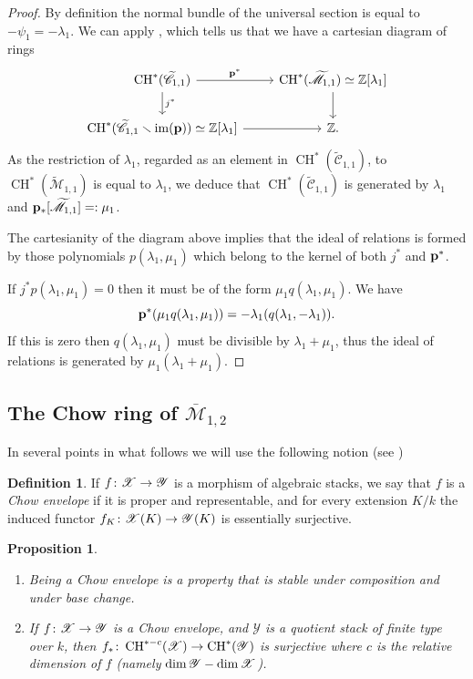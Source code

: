 \documentclass[a4paper, 10pt]{amsart}
\numberwithin{equation}{section}
\numberwithin{subsection}{section}
\newenvironment{enumerate1}
{\begin{enumerate}[\upshape (1)]}
	{\end{enumerate}}
\newtheorem{proposition}[theorem]{Proposition}
\theoremstyle{definition}
\newtheorem{definition}[theorem]{Definition}
\theoremstyle{remark}
\renewcommand{\mathcal}{\mathscr}
\newcommand\cM{\mathcal{M}} \newcommand\cN{\mathcal{N}}
\newcommand\cY{\mathcal{Y}} \newcommand\cZ{\mathcal{Z}}
\newcommand\arr{\ifinner\to\else\longrightarrow\fi}
\newcommand\im[1]{\operatorname{im}(#1)}
\newcommand{\Mbar}{\overline{\cM}}
\newcommand{\Mtilde}{\widetilde{\mathcal M}}
\newcommand{\Ctilde}{\widetilde{\mathcal C}}
\newcommand{\ch}[1][*]{\operatorname{CH}^{#1}}
\begin{document}
	\begin{proof}
		By definition the normal bundle of the universal section is equal to $-\psi_1=-\lambda_1$. We can apply , which tells us that we have a cartesian diagram of rings
		\[
		\begin{tikzcd}
			\ch(\Ctilde_{1,1}) \ar[r, "\bfp^*"] \ar[d, "j^*"] & \ch(\Mtilde_{1,1})\simeq\ZZ[\lambda_1] \ar[d] \\
			\ch(\Ctilde_{1,1}\smallsetminus\im\bfp)\simeq\ZZ[\lambda_1] \ar[r] & \ZZ.
		\end{tikzcd}
		\]
		As the restriction of $\lambda_1$, regarded as an element in $\ch(\Ctilde_{1,1})$, to $\ch(\Mtilde_{1,1})$ is equal to $\lambda_1$, we deduce that $\ch(\Ctilde_{1,1})$ is generated by $\lambda_1$ and $\bfp_*[\Mtilde_{1,1}]=:\mu_1$.
		
		The cartesianity of the diagram above implies that the ideal of relations is formed by those polynomials $p(\lambda_1,\mu_1)$ which belong to the kernel of both $j^*$ and $\mathbf{p}^*$.
		
		If $j^*p(\lambda_1,\mu_1)=0$ then it must be of the form $\mu_1q(\lambda_1,\mu_1)$. We have
		\[ \mathbf{p}^*(\mu_1q(\lambda_1,\mu_1)) = -\lambda_1(q(\lambda_1,-\lambda_1)). \]
		If this is zero then $q(\lambda_1,\mu_1)$ must be divisible by $\lambda_1+\mu_1$, thus the ideal of relations is generated by $\mu_1(\lambda_1+\mu_1)$.
	\end{proof}
	
	\subsection{The Chow ring of $\Mbar_{1,2}$}
	In several points in what follows we will use the following notion (see \cite[Definition 4.1]{Per})
	
	\begin{definition}
		If $f \colon \cX \arr \cY$ is a morphism of algebraic stacks, we say that $f$ is a \emph{Chow envelope} if it is proper and representable, and for every extension $K/k$ the induced functor $f_{K}\colon \cX(K) \arr \cY(K)$ is essentially surjective.
	\end{definition}
	
	\begin{proposition}\hfill
		\begin{enumerate1}
			
			\item Being a Chow envelope is a property that is stable under composition and under base change.
			
			\item If $f\colon \cX \arr \cY$ is a Chow envelope, and $\cY$ is a quotient stack of finite type over $k$, then $f_{*}\colon \operatorname{CH}^{*-c}(\cX) \arr \ch(\cY)$ is surjective where $c$ is the relative dimension of $f$ (namely $\dim \cY - \dim \cX$).
			
		\end{enumerate1}
	\end{proposition}
	
\end{document}
